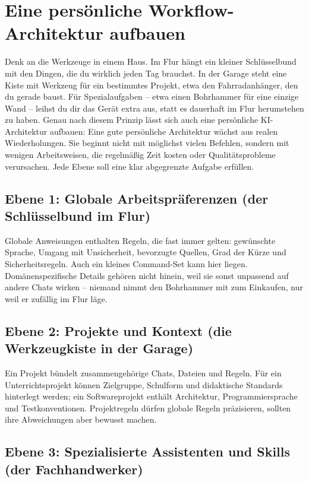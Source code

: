 \chapter{Eine persönliche Workflow-Architektur aufbauen}

Denk an die Werkzeuge in einem Haus. Im Flur hängt ein kleiner Schlüsselbund mit den Dingen, die du wirklich jeden Tag brauchst. In der Garage steht eine Kiste mit Werkzeug für ein bestimmtes Projekt, etwa den Fahrradanhänger, den du gerade baust. Für Spezialaufgaben -- etwa einen Bohrhammer für eine einzige Wand -- leihst du dir das Gerät extra aus, statt es dauerhaft im Flur herumstehen zu haben. Genau nach diesem Prinzip lässt sich auch eine persönliche KI-Architektur aufbauen: Eine gute persönliche Architektur wächst aus realen Wiederholungen. Sie beginnt nicht mit möglichst vielen Befehlen, sondern mit wenigen Arbeitsweisen, die regelmäßig Zeit kosten oder Qualitätsprobleme verursachen. Jede Ebene soll eine klar abgegrenzte Aufgabe erfüllen.



\section{Ebene 1: Globale Arbeitspräferenzen (der Schlüsselbund im Flur)}

Globale Anweisungen enthalten Regeln, die fast immer gelten: gewünschte Sprache, Umgang mit Unsicherheit, bevorzugte Quellen, Grad der Kürze und Sicherheitsregeln. Auch ein kleines Command-Set kann hier liegen. Domänenspezifische Details gehören nicht hinein, weil sie sonst unpassend auf andere Chats wirken -- niemand nimmt den Bohrhammer mit zum Einkaufen, nur weil er zufällig im Flur läge.

\section{Ebene 2: Projekte und Kontext (die Werkzeugkiste in der Garage)}

Ein Projekt bündelt zusammengehörige Chats, Dateien und Regeln. Für ein Unterrichtsprojekt können Zielgruppe, Schulform und didaktische Standards hinterlegt werden; ein Softwareprojekt enthält Architektur, Programmiersprache und Testkonventionen. Projektregeln dürfen globale Regeln präzisieren, sollten ihre Abweichungen aber bewusst machen.

\section{Ebene 3: Spezialisierte Assistenten und Skills (der Fachhandwerker)}

